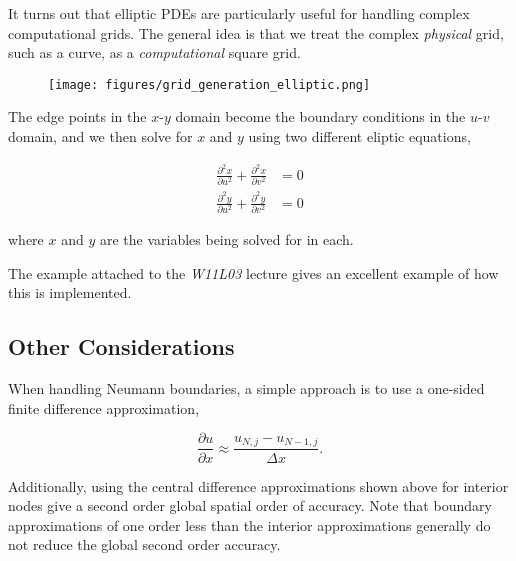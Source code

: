 \documentclass[12pt]{article}
\begin{document}
It turns out that elliptic PDEs are particularly useful for handling complex computational grids. The general idea is that we treat the complex {\it physical} grid, such as a curve, as a {\it computational} square grid.

\begin{figure}[h!]
\centering
\texttt{[image: figures/grid\_generation\_elliptic.png]}
\end{figure}

The edge points in the $x$-$y$ domain become the boundary conditions in the $u$-$v$ domain, and we then solve for $x$ and $y$ using two different eliptic equations, 

\vspace{2mm}

\begin{align*}
\frac{\partial^2x}{\partial u^2} + \frac{\partial^2x}{\partial v^2} &= 0  \\[0.8em]
\frac{\partial^2y}{\partial u^2} + \frac{\partial^2y}{\partial v^2} &= 0
\end{align*}

\vspace{4mm}

where $x$ and $y$ are the variables being solved for in each.

\vspace{4mm}

The example attached to the {\it W11L03} lecture gives an excellent example of how this is implemented.

\subsection{Other Considerations}

When handling Neumann boundaries, a simple approach is to use a one-sided finite difference approximation,

\vspace{2mm}

$$ \frac{\partial u}{\partial x} \approx \frac{u_{N,j} - u_{N-1,j}}{\Delta x}. $$

\vspace{4mm}

Additionally, using the central difference approximations shown above for interior nodes give a second order global spatial order of accuracy. Note that boundary approximations of one order less than the interior approximations generally do not reduce the global second order accuracy.
\end{document}
